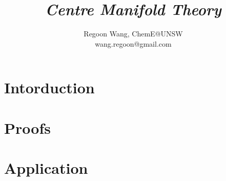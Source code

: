 \documentclass[12pt]{report}
\begin{document}
 
\title{\textbf{\textit{Centre Manifold Theory}}}
\author{Regoon Wang, ChemE@UNSW \\ wang.regoon@gmail.com} 
 
\maketitle

\tableofcontents
\chapter{Intorduction}
\chapter{Proofs}
\chapter{Application}
 
\end{document}
